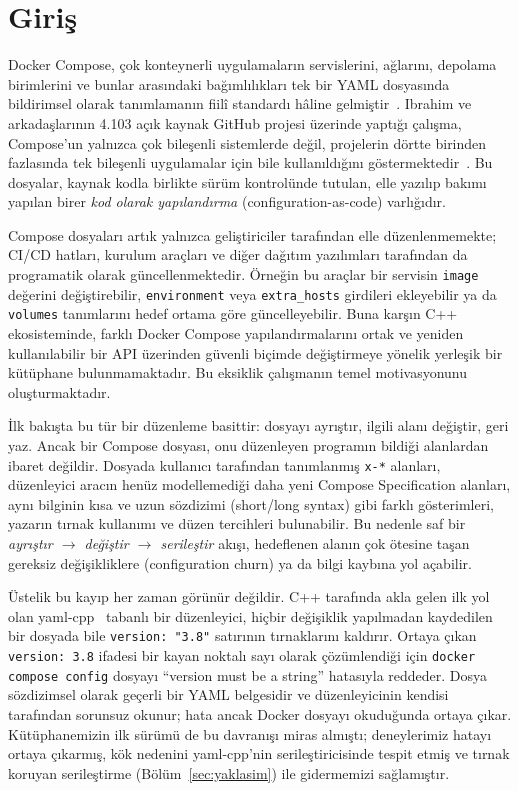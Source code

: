 \documentclass[conference]{IEEEtran}
\begin{document}
\section{Giriş}
\label{sec:giris}

Docker Compose, çok konteynerli uygulamaların servislerini, ağlarını,
depolama birimlerini ve bunlar arasındaki bağımlılıkları tek bir YAML
dosyasında bildirimsel olarak tanımlamanın fiilî standardı hâline
gelmiştir~\cite{composespec}. Ibrahim ve arkadaşlarının 4.103 açık kaynak
GitHub projesi üzerinde yaptığı çalışma, Compose'un yalnızca çok bileşenli
sistemlerde değil, projelerin dörtte birinden fazlasında tek bileşenli
uygulamalar için bile kullanıldığını göstermektedir~\cite{ibrahim2021dockercompose}.
Bu dosyalar, kaynak kodla birlikte sürüm kontrolünde tutulan, elle yazılıp
bakımı yapılan birer \emph{kod olarak yapılandırma} (configuration-as-code)
varlığıdır.

Compose dosyaları artık yalnızca geliştiriciler tarafından elle
düzenlenmemekte; CI/CD hatları, kurulum araçları ve diğer dağıtım
yazılımları tarafından da programatik olarak güncellenmektedir. Örneğin
bu araçlar bir servisin \texttt{image} değerini değiştirebilir,
\texttt{environment} veya \texttt{extra\_hosts} girdileri ekleyebilir ya
da \texttt{volumes} tanımlarını hedef ortama göre güncelleyebilir. Buna
karşın C++ ekosisteminde, farklı Docker Compose yapılandırmalarını ortak ve
yeniden kullanılabilir bir API üzerinden güvenli biçimde değiştirmeye
yönelik yerleşik bir kütüphane bulunmamaktadır. Bu eksiklik çalışmanın temel
motivasyonunu oluşturmaktadır.

İlk bakışta bu tür bir düzenleme basittir: dosyayı ayrıştır, ilgili alanı
değiştir, geri yaz. Ancak bir Compose dosyası, onu düzenleyen programın
bildiği alanlardan ibaret değildir. Dosyada kullanıcı tarafından
tanımlanmış \texttt{x-*} alanları, düzenleyici aracın henüz
modellemediği daha yeni Compose Specification alanları, aynı bilginin kısa
ve uzun sözdizimi (short/long syntax) gibi farklı gösterimleri, yazarın
tırnak kullanımı ve düzen tercihleri bulunabilir. Bu nedenle saf bir
\emph{ayrıştır $\rightarrow$ değiştir $\rightarrow$ serileştir} akışı,
hedeflenen alanın çok ötesine taşan gereksiz değişikliklere
(configuration churn) ya da bilgi kaybına yol açabilir.

Üstelik bu kayıp her zaman görünür değildir. C++ tarafında akla gelen ilk
yol olan yaml-cpp~\cite{yamlcpp} tabanlı bir düzenleyici, hiçbir değişiklik
yapılmadan kaydedilen bir dosyada bile \texttt{version: "3.8"} satırının
tırnaklarını kaldırır. Ortaya çıkan \texttt{version: 3.8} ifadesi bir kayan
noktalı sayı olarak çözümlendiği için \texttt{docker compose config} dosyayı
``version must be a string'' hatasıyla reddeder. Dosya sözdizimsel olarak
geçerli bir YAML belgesidir ve düzenleyicinin kendisi tarafından sorunsuz
okunur; hata ancak Docker dosyayı okuduğunda ortaya çıkar. Kütüphanemizin
ilk sürümü de bu davranışı miras almıştı; deneylerimiz hatayı ortaya
çıkarmış, kök nedenini yaml-cpp'nin serileştiricisinde tespit etmiş ve
tırnak koruyan serileştirme (Bölüm~\ref{sec:yaklasim}) ile gidermemizi
sağlamıştır.
\end{document}
